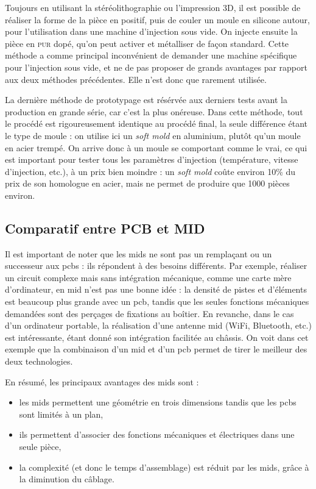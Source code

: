 Toujours en utilisant la stéréolithographie ou l'impression 3D, il est possible de réaliser la forme de la pièce en positif, puis de couler un moule en silicone autour, pour l'utilisation dans une machine d'injection sous vide.
On injecte ensuite la pièce en \textsc{pur} dopé, qu'on peut activer et métalliser de façon standard.
Cette méthode a comme principal inconvénient de demander une machine spécifique pour l'injection sous vide, et ne de pas proposer de grands avantages par rapport aux deux méthodes précédentes.
Elle n'est donc que rarement utilisée.

La dernière méthode de prototypage est résérvée aux derniers tests avant la production en grande série, car c'est la plus onéreuse.
Dans cette méthode, tout le procédé est rigoureusement identique au procédé final, la seule différence étant le type de moule : on utilise ici un \textit{soft mold} en aluminium, plutôt qu'un moule en acier trempé.
On arrive donc à un moule se comportant comme le vrai, ce qui est important pour tester tous les paramètres d'injection (température, vitesse d'injection, etc.), à un prix bien moindre : un \textit{soft mold} coûte environ 10\% du prix de son homologue en acier, mais ne permet de produire que 1000 pièces environ.
\subsection{Comparatif entre PCB et MID}
Il est important de noter que les \glspl{mid} ne sont pas un remplaçant ou un successeur aux \glspl{pcb} : ils répondent à des besoins différents.
Par exemple, réaliser un circuit complexe mais sans intégration mécanique, comme une carte mère d'ordinateur, en \gls{mid} n'est pas une bonne idée : la densité de pistes et d'éléments est beaucoup plus grande avec un \gls{pcb}, tandis que les seules fonctions mécaniques demandées sont des perçages de fixations au boîtier.
En revanche, dans le cas d'un ordinateur portable, la réalisation d'une antenne \gls{mid} (WiFi, Bluetooth, etc.) est intéressante, étant donné son intégration facilitée au châssis.
On voit dans cet exemple que la combinaison d'un \gls{mid} et d'un \gls{pcb} permet de tirer le meilleur des deux technologies.

En résumé, les principaux avantages des \glspl{mid} sont :
\begin{itemize}
    \item les \glspl{mid} permettent une géométrie en trois dimensions tandis que les \glspl{pcb} sont limités à un plan,
    \item ils permettent d'associer des fonctions mécaniques et électriques dans une seule pièce,
    \item la complexité (et donc le temps d'assemblage) est réduit par les \glspl{mid}, grâce à la diminution du câblage.
\end{itemize}

